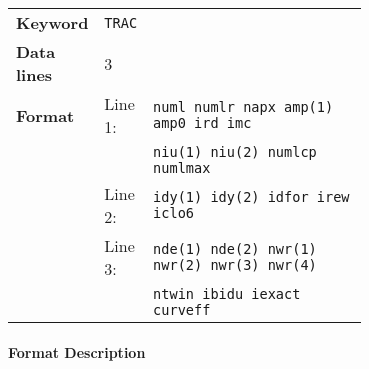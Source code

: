 \bigskip
\begin{tabular}{@{}llp{0.7\linewidth}}
    \textbf{Keyword}    & \texttt{TRAC}\index{TRAC} &\\
    \textbf{Data lines} & 3 &\\
    \textbf{Format}     & Line 1: & \texttt{numl numlr napx amp(1) amp0 ird imc} \\
                        &         & \texttt{niu(1) niu(2) numlcp numlmax} \\
                        & Line 2: & \texttt{idy(1) idy(2) idfor irew iclo6} \\
                        & Line 3: & \texttt{nde(1) nde(2) nwr(1) nwr(2) nwr(3) nwr(4)} \\
                        &         & \texttt{ntwin ibidu iexact curveff}
\end{tabular}

\paragraph{Format Description}~

